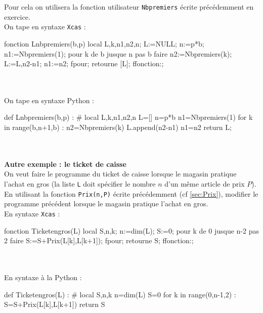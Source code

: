 \documentclass[12pt,a4paper]{book}
\begin{document}
\begin{giacjshere}
Pour cela on utilisera la fonction utilisateur {\tt Nbpremiers} \'ecrite 
pr\'ec\'edemment en exercice.\\
On tape en syntaxe {\tt Xcas} :
\begin{giaconload}
fonction Lnbpremiers(b,p)
  local L,k,n1,n2,n;
  L:=NULL;
  n:=p*b;
  n1:=Nbpremiers(1);
  pour k de b jusque n pas b faire 
     n2:=Nbpremiers(k);
     L:=L,n2-n1;
     n1:=n2;
  fpour;
  retourne [L];
  ffonction:;
\end{giaconload}
\\
\\
On tape en syntaxe Python :
\begin{giacprog}
def Lnbpremiers(b,p) :
    # local L,k,n1,n2,n
    L=[]
    n=p*b
    n1=Nbpremiers(1)
    for k in range(b,n+1,b) : 
        n2=Nbpremiers(k)
        L.append(n2-n1)
        n1=n2
    return L;
\end{giacprog}
\\
\\

{\bf  Autre exemple : le ticket de caisse}\\
On veut faire le programme du ticket de caisse lorsque le magasin pratique 
l'achat en gros (la liste {\tt L}  doit sp\'ecifier le nombre $n$ d'un m\^eme 
article de prix $P$).\\
En utilisant la fonction {\tt Prix(n,P)} \'ecrite pr\'ec\'edemment (cf 
\ref{sec:Prix}), modifier le programme pr\'ec\'edent lorsque le magasin 
pratique l'achat en gros.\\
En syntaxe {\tt Xcas} :
\begin{giaconload}
fonction Ticketengros(L) 
 local S,n,k; 
 n:=dim(L);
 S:=0;
 pour k de 0 jusque n-2 pas 2 faire 
   S:=S+Prix(L[k],L[k+1]); 
 fpour;
 retourne S; 
ffonction:;
\end{giaconload}
\\
\\
En syntaxe \`a la Python :
\begin{giacprog}
def Ticketengros(L) :
    # local S,n,k 
    n=dim(L)
    S=0
    for k in range(0,n-1,2) : 
        S=S+Prix(L[k],L[k+1]) 
    return S 
\end{giacprog}
\\


\end{giacjshere}
\end{document}
